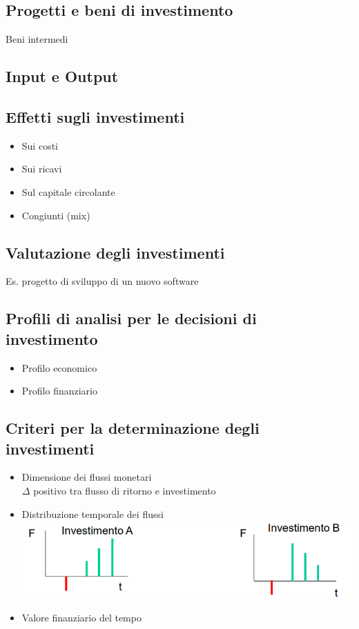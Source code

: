 \documentclass{report}
\begin{document}
\subsection{Progetti e beni di investimento}
Beni intermedi
\subsection{Input e Output}
\subsection{Effetti sugli investimenti}
\begin{itemize}
  \item Sui costi
  \item Sui ricavi
  \item Sul capitale circolante
  \item Congiunti (mix)
\end{itemize}
\subsection{Valutazione degli investimenti}
Es. progetto di sviluppo di un nuovo software
\subsection{Profili di analisi per le decisioni di investimento}
\begin{itemize}
  \item Profilo economico
  \item Profilo finanziario
\end{itemize}
\subsection{Criteri per la determinazione degli investimenti}
\begin{itemize}
  \item Dimensione dei flussi monetari\\$\Delta$ positivo tra flusso di ritorno e investimento
  \item Distribuzione temporale dei flussi\\\includegraphics[scale=0.4]{img1.png}
  \item Valore finanziario del tempo
\end{itemize}
\end{document}
